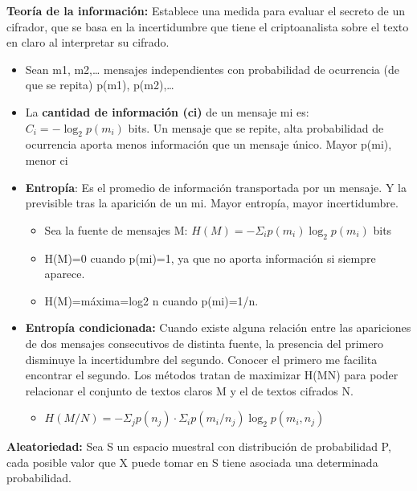\documentclass[12pt, twoside, openright]{report} %
\begin{document}
  
  \textbf{Teoría de la información:} Establece una medida para evaluar
  el secreto de un cifrador, que se basa en la incertidumbre que tiene
  el criptoanalista sobre el texto en claro al interpretar su cifrado.
  

  \begin{itemize}
  \item Sean m1, m2,\ldots{} mensajes independientes con probabilidad de
    ocurrencia (de que se repita) p(m1), p(m2),\ldots{}
    
  \item La \textbf{cantidad de información (ci)} de un mensaje mi es: $C_i=-\log_2 p(m_i)$ bits. Un
    mensaje que se repite, alta probabilidad de ocurrencia aporta menos
    información que un mensaje único. Mayor p(mi), menor ci
    
  \item \textbf{Entropía}: Es el promedio de información transportada por un
    mensaje. Y la previsible tras la aparición de un mi. Mayor entropía,
    mayor incertidumbre.
    
    \begin{itemize}
    \item Sea la fuente de mensajes M: $H(M)=-\Sigma_i p(m_i) \log_2 p(m_i)$ bits
      
    \item H(M)=0 cuando p(mi)=1, ya que no aporta información si siempre
      aparece.
      
    \item H(M)=máxima=log2 n cuando p(mi)=1/n.
      
    \end{itemize}
  \item \textbf{Entropía condicionada:} Cuando existe alguna relación entre
    las apariciones de dos mensajes consecutivos de distinta fuente, la
    presencia del primero disminuye la incertidumbre del segundo.
    Conocer el primero me facilita encontrar el segundo. Los métodos
    tratan de maximizar H(M\textbar N) para poder relacionar el conjunto
    de textos claros M y el de textos cifrados N.
 
    \begin{itemize}
    \item $H(M/N) =-\Sigma_j p(n_j)\cdot \Sigma_i p(m_i/n_j) \log_2 p(m_i, n_j)$
      
    \end{itemize}
  \end{itemize}

  
  \textbf{Aleatoriedad:} Sea S un espacio muestral con distribución de
  probabilidad P, cada posible valor que X puede tomar en S tiene
  asociada una determinada probabilidad.
  
\end{document}
